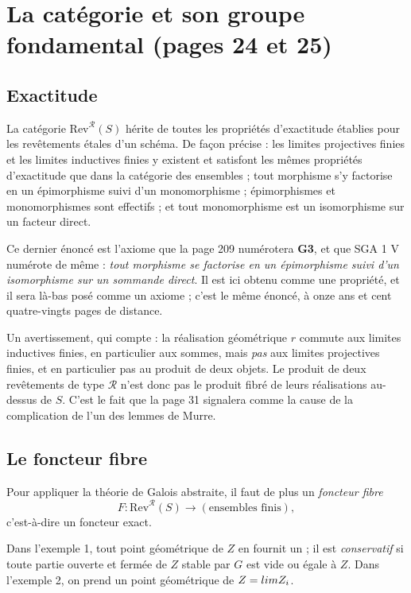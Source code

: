 \documentclass[11pt,a4paper]{article}
\begin{document}
\section*{La catégorie et son groupe fondamental (pages 24 et 25)}

\subsection*{Exactitude}

La catégorie $\mathrm{Rev}^{\mathcal{R}}(S)$ hérite de toutes les propriétés
d'exactitude établies pour les revêtements étales d'un schéma. De façon
précise : les limites projectives finies et les limites inductives finies y
existent et satisfont les mêmes propriétés d'exactitude que dans la catégorie
des ensembles ; tout morphisme s'y factorise en un épimorphisme suivi d'un
monomorphisme ; épimorphismes et monomorphismes sont effectifs ; et tout
monomorphisme est un isomorphisme sur un facteur direct.

Ce dernier énoncé est l'axiome que la page 209 numérotera
\textbf{G3}, et que SGA 1 V numérote de même : \emph{tout morphisme se
factorise en un épimorphisme suivi d'un isomorphisme sur un sommande direct}.
Il est ici obtenu comme une propriété, et il sera là-bas posé comme un axiome ;
c'est le même énoncé, à onze ans et cent quatre-vingts pages de distance.

Un avertissement, qui compte : la réalisation
géométrique $r$ commute aux limites inductives finies, en particulier aux
sommes, mais \emph{pas} aux limites projectives finies, et en particulier
pas au produit de deux objets. Le produit de deux revêtements de type
$\mathcal{R}$ n'est donc pas le produit fibré de leurs réalisations au-dessus
de $S$. C'est le fait que la page 31 signalera comme la cause de la
complication de l'un des lemmes de Murre.

\subsection*{Le foncteur fibre}

Pour appliquer la théorie de Galois abstraite, il faut de plus un
\emph{foncteur fibre}
\[
  F : \mathrm{Rev}^{\mathcal{R}}(S) \longrightarrow (\text{ensembles finis}) ,
\]
c'est-à-dire un foncteur exact.

Dans l'exemple 1, tout point géométrique de $Z$ en fournit un ; il est
\emph{conservatif} si toute partie ouverte et fermée de $Z$ stable par $G$ est
vide ou égale à $Z$. Dans l'exemple 2, on prend un point géométrique de
$Z = \varprojlim Z_{i}$.
\end{document}
